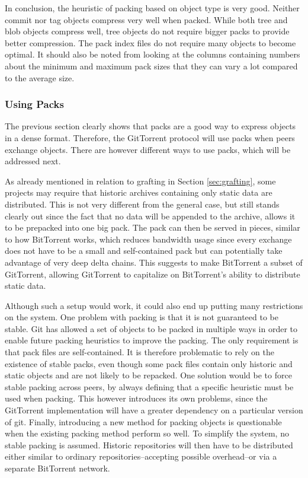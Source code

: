 In conclusion, the heuristic of packing based on object type is very
good. Neither commit nor tag objects compress very well when packed.
While both tree and blob objects compress well, tree objects do not
require bigger packs to provide better compression. The pack index files
do not require many objects to become optimal. It should also
be noted from looking at the columns containing numbers about the
minimum and maximum pack sizes that they can vary a lot compared to
the average size.


\subsubsection{Using Packs}

The previous section clearly shows that packs are a good way to
express objects in a dense format. Therefore, the GitTorrent protocol
will use packs when peers exchange objects. There are however
different ways to use packs, which will be addressed next.

As already mentioned in relation to grafting in Section
\ref{sec:grafting}, some projects may require that historic archives
containing only static data are distributed. This is not very
different from the general case, but still stands clearly out since
the fact that no data will be appended to the archive, allows it to be
prepacked into one big pack. The pack can then be served in pieces,
similar to how BitTorrent works, which reduces bandwidth usage since
every exchange does not have to be a small and self-contained pack but
can potentially take advantage of very deep delta chains. This
suggests to make BitTorrent a subset of GitTorrent, allowing GitTorrent
to capitalize on BitTorrent's ability to distribute static
data.

Although such a setup would work, it could also end up putting many
restrictions on the system. One problem with packing is that it is not
guaranteed to be stable. Git has allowed a set of objects to be packed
in multiple ways in order to enable future packing heuristics to
improve the packing. The only requirement is that pack files are
self-contained. It is therefore problematic to rely on the existence
of stable packs, even though some pack files contain only historic and
static objects and are not likely to be repacked. One solution would
be to force stable packing across peers, by always defining that a
specific heuristic must be used when packing. This however introduces
its own problems, since the GitTorrent implementation will have a
greater dependency on a particular version of git. Finally,
introducing a new method for packing objects is questionable when the
existing packing method perform so well. To simplify the system, no
stable packing is assumed. Historic repositories will then have to be
distributed either similar to ordinary repositories--accepting possible
overhead--or via a separate BitTorrent network.

